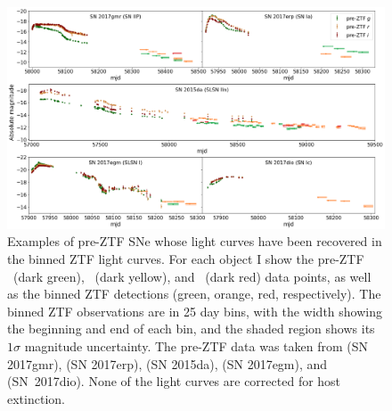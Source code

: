 \documentclass[a4paper,oneside,12pt, class=Latex/Classes/PhDthesisPSnPDF, crop=false]{standalone}
\begin{document}
\begin{figure}
    \centering
    \includegraphics[width=\textwidth]{../Images/chapter_4/tails.png}
    \caption{Examples of pre-ZTF SNe whose light curves have been recovered in the binned ZTF light curves. For each object I show the pre-ZTF \ztfg~(dark green), \ztfr~(dark yellow), and \ztfi~(dark red) data points, as well as the binned ZTF detections (green, orange, red, respectively). The binned ZTF observations are in 25 day bins, with the width showing the beginning and end of each bin, and the shaded region shows its $1\sigma$ magnitude uncertainty. The pre-ZTF data was taken from \citet{2017gmr} (SN 2017gmr), \citet{2017erp} (SN 2017erp), \citet{2015da_2020} (SN 2015da), \citet{2017egm} (SN 2017egm), and \citet{2017dio} (SN~2017dio). None of the light curves are corrected for host extinction.}
    \label{tail-examples}
\end{figure}
\end{document}
